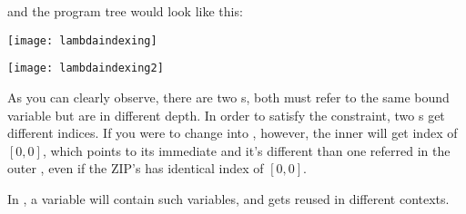 and the program tree would look like this:

{\centering
\begin{minipage}{.5\textwidth}
  \centering
  \texttt{[image: lambdaindexing]}
  \label{fig:lambdaraw}
\end{minipage}%
\begin{minipage}{.5\textwidth}
  \centering
  \texttt{[image: lambdaindexing2]}
  \label{fig:lambdaindexed}
\end{minipage}
}

As you can clearly observe, there are two s, both must refer to the same bound variable but are in different depth. In order to satisfy the constraint, two s get different indices. If you were to change \code{[M]} into \code{[C]}, however, the inner  will get index of $[0,0]$, which points to its immediate  and it's different  than one referred in the outer , even if the ZIP's  has identical index of $[0,0]$.

In , a variable  will contain such variables, and gets reused in different contexts.
